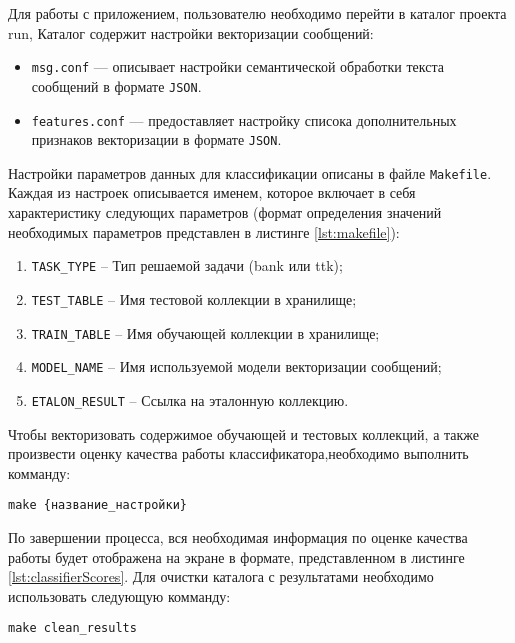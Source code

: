         Для работы с приложением, пользователю необходимо перейти в каталог проекта {run},
        Каталог содержит настройки векторизации сообщений:
        \begin{itemize}
            \item {\tt msg.conf} --- описывает настройки семантической обработки текста
                сообщений в формате {\tt JSON}.
            \item {\tt features.conf} --- предоставляет настройку списока
                дополнительных признаков векторизации в формате {\tt JSON}.
        \end{itemize}

        Настройки параметров данных для классификации описаны в файле {\tt Makefile}.
        Каждая из настроек описывается именем, которое включает в себя
        характеристику следующих параметров (формат определения значений необходимых
        параметров представлен в листинге \ref{lst:makefile}):

        \begin{enumerate}
            \item {\tt TASK\_TYPE} -- Тип решаемой задачи ({bank} или {ttk});
            \item {\tt TEST\_TABLE} -- Имя тестовой коллекции в хранилище;
            \item {\tt TRAIN\_TABLE} -- Имя обучающей коллекции в хранилище;
            \item {\tt MODEL\_NAME} -- Имя используемой модели векторизации сообщений;
            \item {\tt ETALON\_RESULT} -- Ссылка на эталонную коллекцию.
        \end{enumerate}

        \lstset{style=bash}
        

        Чтобы векторизовать содержимое обучающей и тестовых коллекций, а также
        произвести оценку качества работы классификатора,необходимо выполнить
        комманду:
        \begin{center}
            {\tt make {\{название\_настройки\}}}
        \end{center}

        По завершении процесса, вся необходимая информация по оценке качества
        работы будет отображена на экране в формате, представленном в листинге
        \ref{lst:classifierScores}.
        Для очистки каталога с результатами необходимо использовать следующую
        комманду:
        \begin{center}
            {\tt make clean\_results}
        \end{center}

